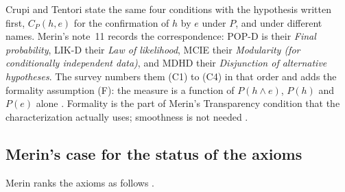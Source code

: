 Crupi and Tentori state the same four conditions with the hypothesis
written first, \(C_P(h,e)\) for the confirmation of \(h\) by \(e\)
under \(P\), and under different names. Merin's note~11 records the
correspondence: POP-D is their \emph{Final probability}, LIK-D their
\emph{Law of likelihood}, MCIE their \emph{Modularity (for
conditionally independent data)}, and MDHD their \emph{Disjunction of
alternative hypotheses}. The survey numbers them (C1) to (C4) in that
order and adds the formality assumption (F): the measure is a function
of \(P(h\land e)\), \(P(h)\) and \(P(e)\) alone
\cite[p.~274, n.~11]{Merin2021Relevance}
\cite[pp.~654--655]{CrupiTentori2016Confirmation}. Formality is the
part of Merin's Transparency condition that the characterization
actually uses; smoothness is not needed
\cite[pp.~269, 271]{Merin2021Relevance}.

\subsection{Merin's case for the status of the axioms}
\label{sec:p15-w02b-p15-024-axiom-case}

Merin ranks the axioms as follows \cite[p.~271 and p.~274,
nn.~12--14]{Merin2021Relevance}.

